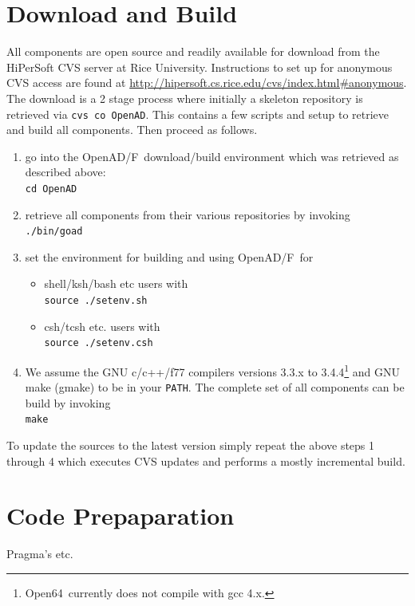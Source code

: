 \documentclass{book}
\newcommand{\OpenADF}{OpenAD/F}
\newcommand{\OpenSixtyFour}{Open64}
\newcommand{\code}[1]{{\small\tt{#1}}}
\begin{document}
\section{Download and Build}\label{sec:dab}
All components are open source and readily available for download from 
the HiPerSoft CVS server at Rice University. Instructions to set up for anonymous 
CVS access are found at \url{http://hipersoft.cs.rice.edu/cvs/index.html#anonymous}.
The download is a 2 stage process where initially a skeleton repository is 
retrieved via \code{cvs co OpenAD}. This contains a few scripts and setup to 
retrieve and build all components. Then proceed as follows.
\begin{enumerate}
\item go into the \OpenADF\ download/build environment which was retrieved as described above:\\
\code {cd OpenAD}
\item retrieve all components from their various repositories by invoking\\
\code{./bin/goad}
\item set the environment for building and using \OpenADF\ for
\begin{itemize}
\item shell/ksh/bash etc users with\\
\code{source ./setenv.sh}
\item csh/tcsh etc. users with\\
\code{source ./setenv.csh}
\end{itemize}
\item We assume the GNU c/c++/f77 compilers versions 3.3.x to 3.4.4\footnote{
\OpenSixtyFour\ currently does not compile with gcc 4.x.
} 
and GNU make (gmake) to be in your \code{PATH}.
The complete set of all components can be build by invoking\\
\code{make}
\end{enumerate}
To update the sources to the latest version simply repeat the above steps 1 through 4 which 
executes CVS updates and performs a mostly incremental build.

\section{Code Prepaparation}

Pragma's etc. 
\end{document}
